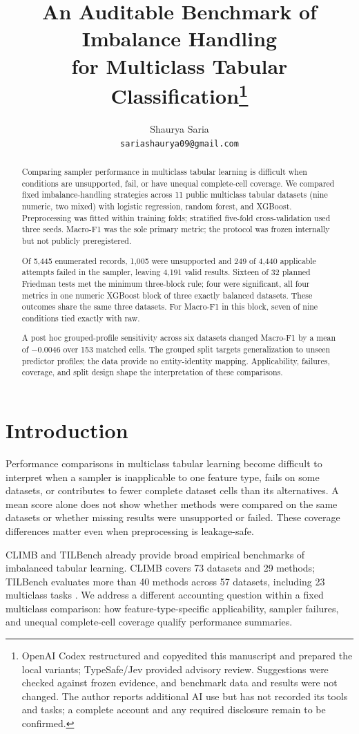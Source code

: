 \documentclass[10pt]{article}
\title{An Auditable Benchmark of Imbalance Handling\\for Multiclass Tabular Classification\thanks{OpenAI Codex restructured and copyedited this manuscript and prepared the local variants; TypeSafe/Jev provided advisory review. Suggestions were checked against frozen evidence, and benchmark data and results were not changed. The author reports additional AI use but has not recorded its tools and tasks; a complete account and any required disclosure remain to be confirmed.}}
\author{Shaurya Saria\\\texttt{sariashaurya09@gmail.com}}
\begin{document}
\maketitle

\begin{abstract}
Comparing sampler performance in multiclass tabular learning is difficult when conditions are unsupported, fail, or have unequal complete-cell coverage. We compared fixed imbalance-handling strategies across 11 public multiclass tabular datasets (nine numeric, two mixed) with logistic regression, random forest, and XGBoost. Preprocessing was fitted within training folds; stratified five-fold cross-validation used three seeds. Macro-F1 was the sole primary metric; the protocol was frozen internally but not publicly preregistered.

Of 5,445 enumerated records, 1,005 were unsupported and 249 of 4,440 applicable attempts failed in the sampler, leaving 4,191 valid results. Sixteen of 32 planned Friedman tests met the minimum three-block rule; four were significant, all four metrics in one numeric XGBoost block of three exactly balanced datasets. These outcomes share the same three datasets. For Macro-F1 in this block, seven of nine conditions tied exactly with raw.

A post hoc grouped-profile sensitivity across six datasets changed Macro-F1 by a mean of $-0.0046$ over 153 matched cells. The grouped split targets generalization to unseen predictor profiles; the data provide no entity-identity mapping. Applicability, failures, coverage, and split design shape the interpretation of these comparisons.
\end{abstract}

\section{Introduction}

Performance comparisons in multiclass tabular learning become difficult to interpret when a sampler is inapplicable to one feature type, fails on some datasets, or contributes to fewer complete dataset cells than its alternatives. A mean score alone does not show whether methods were compared on the same datasets or whether missing results were unsupported or failed. These coverage differences matter even when preprocessing is leakage-safe.

CLIMB and TILBench already provide broad empirical benchmarks of imbalanced tabular learning. CLIMB covers 73 datasets and 29 methods; TILBench evaluates more than 40 methods across 57 datasets, including 23 multiclass tasks \citep{liu2025climb,liu2026tilbenchv2}. We address a different accounting question within a fixed multiclass comparison: how feature-type-specific applicability, sampler failures, and unequal complete-cell coverage qualify performance summaries.
\end{document}
